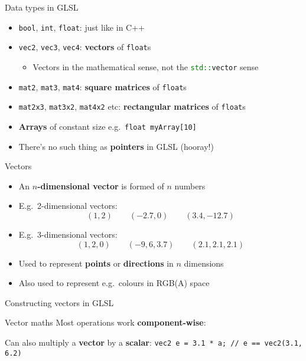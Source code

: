 
\begin{frame}{Data types in GLSL}
	\begin{itemize}
		\pause\item \lstinline{bool}, \lstinline{int}, \lstinline{float}: just like in C++
		\pause\item \lstinline{vec2}, \lstinline{vec3}, \lstinline{vec4}: \textbf{vectors} of \lstinline{float}s
			\begin{itemize}
				\pause\item Vectors in the mathematical sense, not the \lstinline[language=C++]{std::vector} sense
			\end{itemize}
		\pause\item \lstinline{mat2}, \lstinline{mat3}, \lstinline{mat4}: \textbf{square matrices} of \lstinline{float}s
		\pause\item \lstinline{mat2x3}, \lstinline{mat3x2}, \lstinline{mat4x2} etc: \textbf{rectangular matrices} of \lstinline{float}s
		\pause\item \textbf{Arrays} of constant size e.g.\ \lstinline{float myArray[10]}
		\pause\item There's no such thing as \textbf{pointers} in GLSL (hooray!)
	\end{itemize}
\end{frame}

\begin{frame}{Vectors}
	\begin{itemize}
		\pause\item An \textbf{$n$-dimensional vector} is formed of $n$ numbers
		\pause\item E.g.\ 2-dimensional vectors:
			$$ (1, 2) \qquad (-2.7, 0) \qquad (3.4, -12.7) $$
		\pause\item E.g.\ 3-dimensional vectors:
			$$ (1, 2, 0) \qquad (-9, 6, 3.7) \qquad (2.1, 2.1, 2.1) $$
		\pause\item Used to represent \textbf{points} or \textbf{directions} in $n$ dimensions
		\pause\item Also used to represent e.g.\ colours in RGB(A) space
	\end{itemize}
\end{frame}

\begin{frame}{Constructing vectors in GLSL}
	
\end{frame}

\begin{frame}{Vector maths}
	\pause Most operations work \textbf{component-wise}:
	
	\pause Can also multiply a \textbf{vector} by a \textbf{scalar}:
	\lstinline{vec2 e = 3.1 * a; // e == vec2(3.1, 6.2)}
\end{frame}

